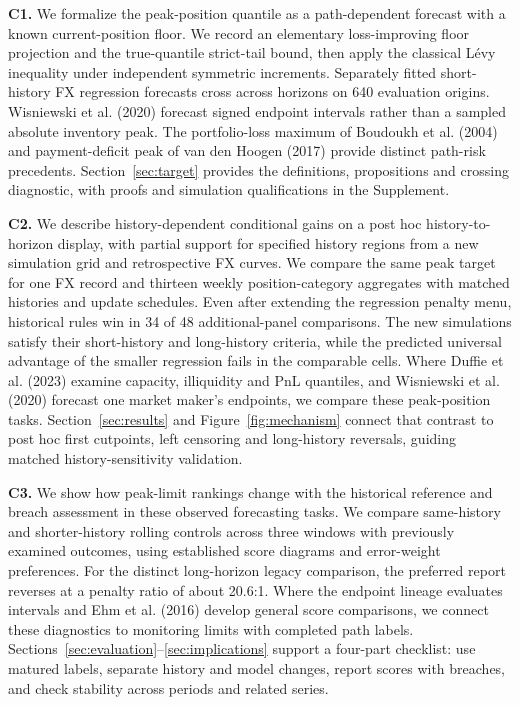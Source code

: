 \documentclass[11pt,a4paper]{article}
\newcounter{proposition}
\begin{document}
\textbf{C1.} We formalize the peak-position quantile as a path-dependent forecast with a known current-position floor. We record an elementary loss-improving floor projection and the true-quantile strict-tail bound, then apply the classical Lévy inequality under independent symmetric increments. Separately fitted short-history FX regression forecasts cross across horizons on 640 evaluation origins. Wisniewski et al. (2020) forecast signed endpoint intervals rather than a sampled absolute inventory peak. The portfolio-loss maximum of Boudoukh et al. (2004) and payment-deficit peak of van den Hoogen (2017) provide distinct path-risk precedents. Section~\ref{sec:target} provides the definitions, propositions and crossing diagnostic, with proofs and simulation qualifications in the Supplement.

\textbf{C2.} We describe history-dependent conditional gains on a post hoc history-to-horizon display, with partial support for specified history regions from a new simulation grid and retrospective FX curves. We compare the same peak target for one FX record and thirteen weekly position-category aggregates with matched histories and update schedules. Even after extending the regression penalty menu, historical rules win in 34 of 48 additional-panel comparisons. The new simulations satisfy their short-history and long-history criteria, while the predicted universal advantage of the smaller regression fails in the comparable cells. Where Duffie et al. (2023) examine capacity, illiquidity and PnL quantiles, and Wisniewski et al. (2020) forecast one market maker's endpoints, we compare these peak-position tasks. Section~\ref{sec:results} and Figure~\ref{fig:mechanism} connect that contrast to post hoc first cutpoints, left censoring and long-history reversals, guiding matched history-sensitivity validation.

\textbf{C3.} We show how peak-limit rankings change with the historical reference and breach assessment in these observed forecasting tasks. We compare same-history and shorter-history rolling controls across three windows with previously examined outcomes, using established score diagrams and error-weight preferences. For the distinct long-horizon legacy comparison, the preferred report reverses at a penalty ratio of about 20.6:1. Where the endpoint lineage evaluates intervals and Ehm et al. (2016) develop general score comparisons, we connect these diagnostics to monitoring limits with completed path labels. Sections~\ref{sec:evaluation}--\ref{sec:implications} support a four-part checklist: use matured labels, separate history and model changes, report scores with breaches, and check stability across periods and related series.
\end{document}
